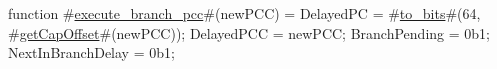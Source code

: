 function #\hyperref[zexecutezybranchzypcc]{execute\_branch\_pcc}#(newPCC) = {
  DelayedPC = #\hyperref[ztozybits]{to\_bits}#(64, #\hyperref[zgetCapOffset]{getCapOffset}#(newPCC));
  DelayedPCC = newPCC;
  BranchPending = 0b1;
  NextInBranchDelay = 0b1;
}
